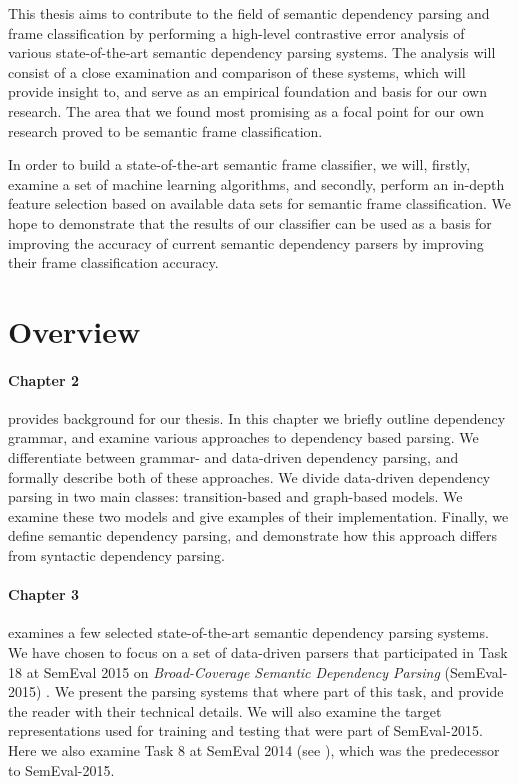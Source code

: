This thesis aims to contribute to the field of semantic dependency parsing and frame classification by performing a high-level contrastive error analysis of various state-of-the-art semantic dependency parsing systems. The analysis will consist of a close examination and comparison of these systems, which will provide insight to, and serve as an empirical foundation and basis for our own research. The area that we found most promising as a focal point for our own research proved to be semantic frame classification.

In order to build a state-of-the-art semantic frame classifier, we will, firstly, examine a set of machine learning algorithms, and secondly, perform an in-depth feature selection based on available data sets for semantic frame classification. We hope to demonstrate that the results of our classifier can be used as a basis for improving the accuracy of current semantic dependency parsers by improving their frame classification accuracy.

\section{Overview} 

\paragraph{Chapter 2} provides background for our thesis. In this chapter we briefly outline dependency grammar, and examine various approaches to dependency based parsing. We differentiate between grammar- and data-driven dependency parsing, and formally describe both of these approaches. We divide data-driven dependency parsing in two main classes: transition-based and graph-based models. We examine these two models and give examples of their implementation. Finally, we define semantic dependency parsing, and demonstrate how this approach differs from syntactic dependency parsing.

\paragraph{Chapter 3} examines a few selected state-of-the-art semantic dependency parsing systems. We have chosen to focus on a set of data-driven parsers that participated in Task 18 at SemEval 2015 on \textit{Broad-Coverage Semantic Dependency Parsing} (SemEval-2015) \cite{Oepen:15}. We present the parsing systems that where part of this task, and provide the reader with their technical details. We will also examine the target representations used for training and testing that were part of SemEval-2015. Here we also examine Task 8 at SemEval 2014 (see ), which was the predecessor to SemEval-2015.

